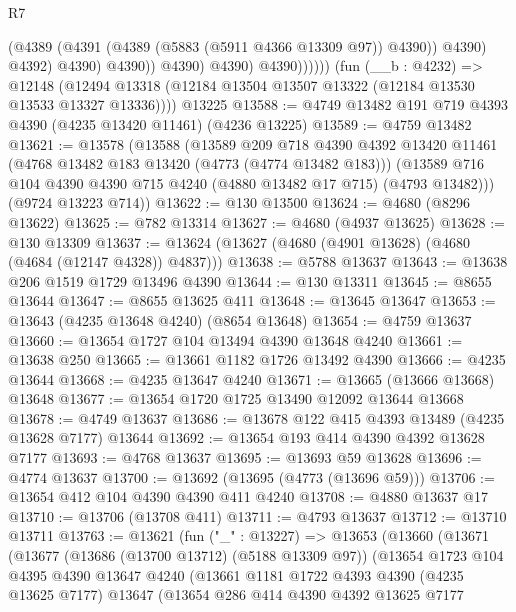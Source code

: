 \begin{lexlean}{R7}
\begin{coremodule}
                            (@4389 (@4391 (@4389 (@5883 (@5911 @4366 @13309 @97)) @4390)) @4390)
                            @4392)
                          @4390)
                        @4390))
                    @4390)
                  @4390)
                @4390))))))
    (fun (__b : @4232) =>
    @12148 (@12494 @13318 (@12184 @13504 @13507 @13322 (@12184 @13530 @13533 @13327 @13336))))
    @13225
@13588 := @4749 @13482 @191 @719 @4393 @4390 (@4235 @13420 @11461) (@4236 @13225)
@13589 := @4759 @13482
@13621 := @13578
    (@13588
      (@13589
        @209
        @718
        @4390
        @4392
        @13420
        @11461
        (@4768 @13482 @183 @13420 (@4773 (@4774 @13482 @183)))
        (@13589 @716 @104 @4390 @4390 @715 @4240 (@4880 @13482 @17 @715) (@4793 @13482)))
      (@9724 @13223 @714))
@13622 := @130 @13500
@13624 := @4680 (@8296 @13622)
@13625 := @782 @13314
@13627 := @4680 (@4937 @13625)
@13628 := @130 @13309
@13637 := @13624 (@13627 (@4680 (@4901 @13628) (@4680 (@4684 (@12147 @4328)) @4837)))
@13638 := @5788 @13637
@13643 := @13638 @206 @1519 @1729 @13496 @4390
@13644 := @130 @13311
@13645 := @8655 @13644
@13647 := @8655 @13625 @411
@13648 := @13645 @13647
@13653 := @13643 (@4235 @13648 @4240) (@8654 @13648)
@13654 := @4759 @13637
@13660 := @13654 @1727 @104 @13494 @4390 @13648 @4240
@13661 := @13638 @250
@13665 := @13661 @1182 @1726 @13492 @4390
@13666 := @4235 @13644
@13668 := @4235 @13647 @4240
@13671 := @13665 (@13666 @13668) @13648
@13677 := @13654 @1720 @1725 @13490 @12092 @13644 @13668
@13678 := @4749 @13637
@13686 := @13678 @122 @415 @4393 @13489 (@4235 @13628 @7177) @13644
@13692 := @13654 @193 @414 @4390 @4392 @13628 @7177
@13693 := @4768 @13637
@13695 := @13693 @59 @13628
@13696 := @4774 @13637
@13700 := @13692 (@13695 (@4773 (@13696 @59)))
@13706 := @13654 @412 @104 @4390 @4390 @411 @4240
@13708 := @4880 @13637 @17
@13710 := @13706 (@13708 @411)
@13711 := @4793 @13637
@13712 := @13710 @13711
@13763 := @13621
    (fun ("_" : @13227) =>
    @13653
      (@13660
        (@13671
          (@13677
            (@13686 (@13700 @13712) (@5188 @13309 @97))
            (@13654
              @1723
              @104
              @4395
              @4390
              @13647
              @4240
              (@13661
                @1181
                @1722
                @4393
                @4390
                (@4235 @13625 @7177)
                @13647
                (@13654
                  @286
                  @414
                  @4390
                  @4392
                  @13625
                  @7177

\end{coremodule}
\end{lexlean}
